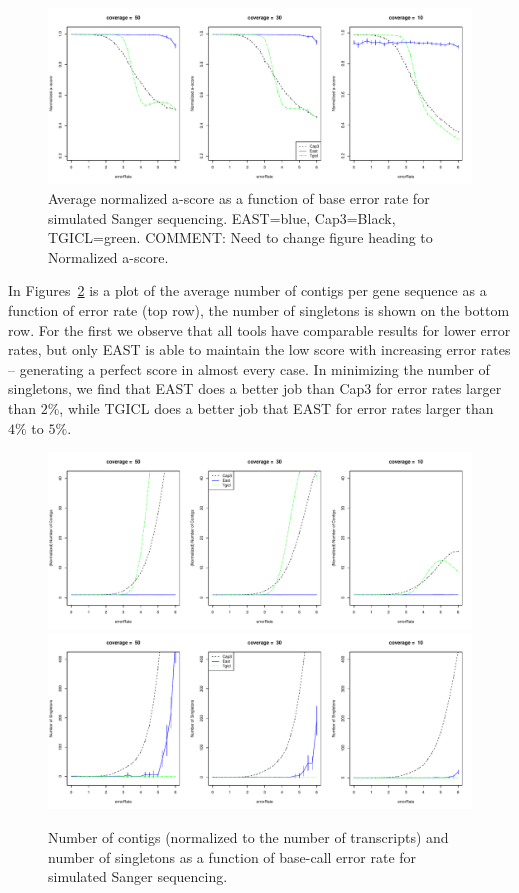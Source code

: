 \documentclass{bioinfo}
\newcommand{\capthree} {{\small Cap3}}
\newcommand{\tgicl} {{\small TGICL}}
\newcommand{\east} {{\small EAST}}
\begin{document}
\begin{figure}[htb]
\centerline{\includegraphics[width=6in]{pics.d/ascore_sanger_norm.pdf}}
\caption{Average normalized a-score as a function of base error rate for
  simulated Sanger sequencing.  \east=blue, \capthree=Black,
  \tgicl=green. COMMENT: Need to change figure heading to Normalized a-score.}
\label{sangerAscore}
\end{figure}

In Figures~\ref{contigsSanger} is a plot of the average number of
contigs per gene sequence as a function of error rate (top row), the
number of singletons is shown on the bottom row.  For the first we
observe that all tools have comparable results for lower error rates,
but only \east\/ is able to maintain the low score with increasing
error rates -- generating a perfect score in almost every case.  In
minimizing the number of singletons, we find that \east\/ does a
better job than \capthree\/ for error rates larger than $2\%$, while
\tgicl\/ does a better job that \east\/ for error rates larger than
$4\%$ to $5\%$.

\begin{figure}[htb]
\includegraphics[width=6in]{pics.d/numContigs_sanger.pdf}
\includegraphics[width=6in]{pics.d/numSingle_sanger.pdf}
\caption{Number of contigs (normalized to the number of transcripts)
  and number of singletons as a function of base-call error
  rate for simulated Sanger sequencing.}
\label{contigsSanger}
\end{figure}
\end{document}
